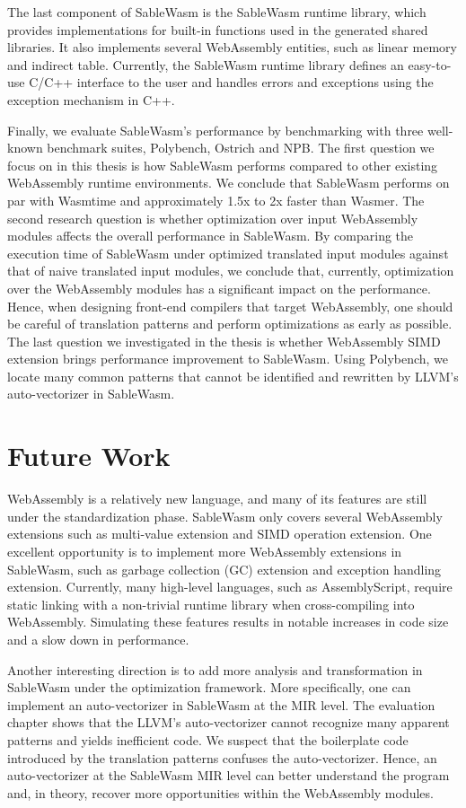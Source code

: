 The last component of SableWasm is the SableWasm runtime library, which provides implementations for built-in functions used in the generated shared libraries. It also implements several WebAssembly entities, such as linear memory and indirect table. Currently, the SableWasm runtime library defines an easy-to-use  C/C++ interface to the user and handles errors and exceptions using the exception mechanism in C++. 

Finally, we evaluate SableWasm's performance by benchmarking with three well-known benchmark suites, Polybench, Ostrich and NPB.  The first question we focus on in this thesis is how SableWasm performs compared to other existing WebAssembly runtime environments. We conclude that SableWasm performs on par with Wasmtime and approximately 1.5x to 2x faster than Wasmer. The second research question is whether optimization over input WebAssembly modules affects the overall performance in SableWasm. By comparing the execution time of SableWasm under optimized translated input modules against that of naive translated input modules, we conclude that, currently, optimization over the WebAssembly modules has a significant impact on the performance. Hence, when designing front-end compilers that target WebAssembly, one should be careful of translation patterns and perform optimizations as early as possible. The last question we investigated in the thesis is whether WebAssembly SIMD extension brings performance improvement to SableWasm. Using Polybench, we locate many common patterns that cannot be identified and rewritten by LLVM's auto-vectorizer in SableWasm.

\section*{Future Work}

WebAssembly is a relatively new language, and many of its features are still under the standardization phase. SableWasm only covers several WebAssembly extensions such as multi-value extension and SIMD operation extension. One excellent opportunity is to implement more WebAssembly extensions in SableWasm, such as garbage collection (GC) extension and exception handling extension. Currently, many high-level languages, such as AssemblyScript, require static linking with a non-trivial runtime library when cross-compiling into WebAssembly. Simulating these features results in notable increases in code size and a slow down in performance. 

Another interesting direction is to add more analysis and transformation in SableWasm under the optimization framework. More specifically, one can implement an auto-vectorizer in SableWasm at the MIR level. The evaluation chapter shows that the LLVM's auto-vectorizer cannot recognize many apparent patterns and yields inefficient code. We suspect that the boilerplate code introduced by the translation patterns confuses the auto-vectorizer. Hence, an auto-vectorizer at the SableWasm MIR level can better understand the program and, in theory, recover more opportunities within the WebAssembly modules.

